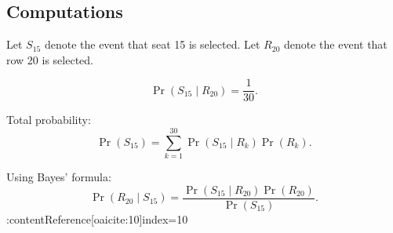\documentclass[11pt]{article}
\begin{document}
\subsection*{Computations}
Let $S_{15}$ denote the event that seat 15 is selected.  
Let $R_{20}$ denote the event that row 20 is selected.

\[
\Pr(S_{15} \mid R_{20}) = \frac{1}{30}.
\]

Total probability:
\[
\Pr(S_{15}) = \sum_{k=1}^{30} \Pr(S_{15} \mid R_k)\Pr(R_k).
\]

Using Bayes' formula:
\[
\Pr(R_{20} \mid S_{15})
= \frac{\Pr(S_{15} \mid R_{20})\Pr(R_{20})}{\Pr(S_{15})}.
\] 
:contentReference[oaicite:10]{index=10}
\end{document}
